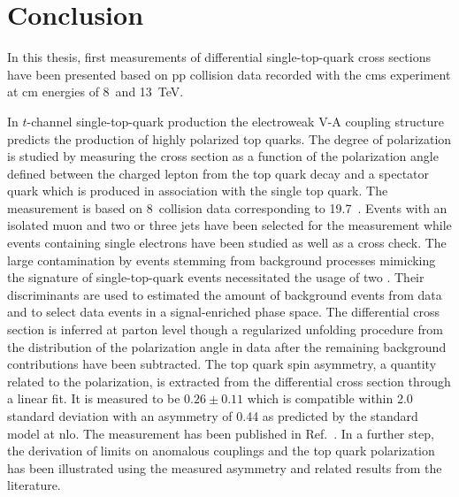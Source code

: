 \chapter*{Conclusion}
\label{ch:conclusion}

In this thesis, first measurements of differential single-top-quark cross sections have been presented based on \acrlong{pp} collision data recorded with the \gls{cms} experiment at \acrlong{cm} energies of 8~and 13~TeV.


In $t$-channel single-top-quark production the electroweak V-A coupling structure predicts the production of highly polarized top quarks. The degree of polarization is studied by measuring the cross section as a function of the polarization angle defined between the charged lepton from the top quark decay and a spectator quark which is produced in association with the single top quark. The measurement is based on 8~\TeV collision data corresponding to 19.7~\invfb. Events with an isolated muon and two or three jets have been selected for the measurement while events containing single electrons have been studied as well as a cross check. The large contamination by events stemming from background processes mimicking the signature of single-top-quark events necessitated the usage of two . Their discriminants are used to estimated the amount of background events from data and to select data events in a signal-enriched phase space. The differential cross section is inferred at parton level though a regularized unfolding procedure from the distribution of the polarization angle in data after the remaining background contributions have been subtracted. The top quark spin asymmetry, a quantity related to the polarization, is extracted from the differential cross section through a linear fit. It is measured to be $0.26\pm 0.11$ which is compatible within 2.0 standard deviation with an asymmetry of 0.44 as predicted by the standard model at \gls{nlo}. The measurement has been published in Ref.~\cite{Khachatryan:2015dzz}. In a further step, the derivation of limits on anomalous couplings and the top quark polarization has been illustrated using the measured asymmetry and related results from the literature.


